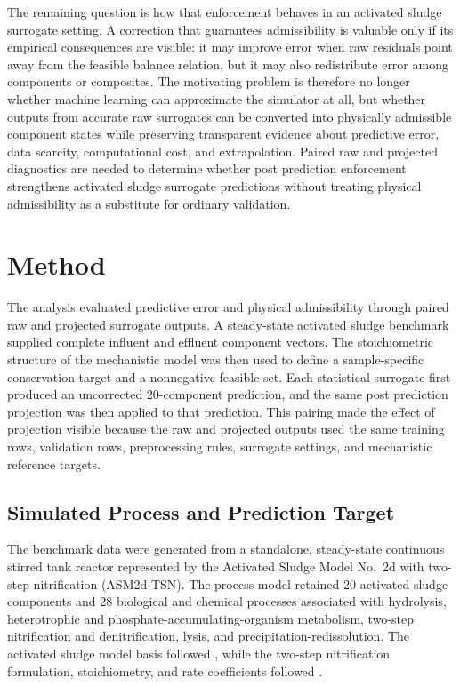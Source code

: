 \documentclass[12pt, twoside]{book}
\begin{document}
The remaining question is how that enforcement behaves in an activated sludge surrogate setting. A correction
that guarantees admissibility is valuable only if its empirical consequences are visible: it may improve error
when raw residuals point away from the feasible balance relation, but it may also redistribute error among
components or composites. The motivating problem is therefore no longer whether machine learning can
approximate the simulator at all, but whether outputs from accurate raw surrogates can be converted into
physically admissible component states while preserving transparent evidence about predictive error, data
scarcity, computational cost, and extrapolation. Paired raw and projected diagnostics are needed to determine
whether post prediction enforcement strengthens activated sludge surrogate predictions without treating
physical admissibility as a substitute for ordinary validation.

\section{Method}

The analysis evaluated predictive error and physical admissibility through paired raw and projected surrogate
outputs. A steady-state activated sludge benchmark supplied complete influent and effluent component vectors.
The stoichiometric structure of the mechanistic model was then used to define a sample-specific conservation
target and a nonnegative feasible set. Each statistical surrogate first produced an uncorrected 20-component
prediction, and the same post prediction projection was then applied to that prediction. This pairing made the
effect of projection visible because the raw and projected outputs used the same training rows, validation
rows, preprocessing rules, surrogate settings, and mechanistic reference targets.

\subsection{Simulated Process and Prediction Target}

The benchmark data were generated from a standalone, steady-state continuous stirred tank reactor represented
by the Activated Sludge Model No.\ 2d with two-step nitrification (ASM2d-TSN). The process model retained 20
activated sludge components and 28 biological and chemical processes associated with hydrolysis,
heterotrophic and phosphate-accumulating-organism metabolism, two-step nitrification and denitrification,
lysis, and precipitation-redissolution. The activated sludge model basis followed \citet{Henze2006}, while the
two-step nitrification formulation, stoichiometry, and rate coefficients followed \citet{Guerrero2011}.
\end{document}
